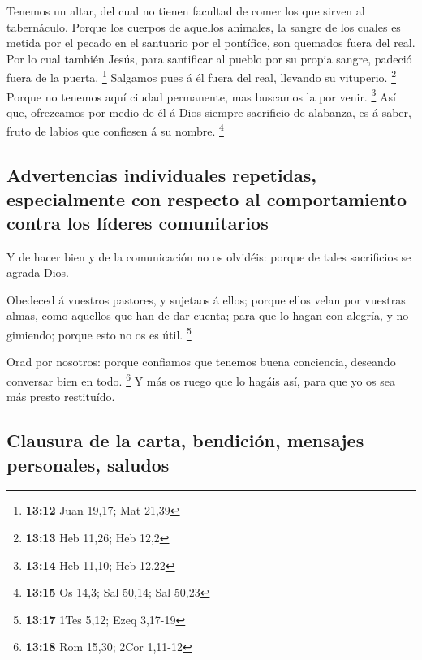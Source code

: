  Tenemos un altar, del cual no tienen facultad de comer
los que sirven al tabernáculo.  Porque los cuerpos de
aquellos animales, la sangre de los cuales es metida por el pecado en el
santuario por el pontífice, son quemados fuera del real. 
Por lo cual también Jesús, para santificar al pueblo por su propia
sangre, padeció fuera de la puerta. \footnote{\textbf{13:12} Juan 19,17;
  Mat 21,39}  Salgamos pues á él fuera del real, llevando
su vituperio. \footnote{\textbf{13:13} Heb 11,26; Heb 12,2}
 Porque no tenemos aquí ciudad permanente, mas buscamos
la por venir. \footnote{\textbf{13:14} Heb 11,10; Heb 12,22}
 Así que, ofrezcamos por medio de él á Dios siempre
sacrificio de alabanza, es á saber, fruto de labios que confiesen á su
nombre. \footnote{\textbf{13:15} Os 14,3; Sal 50,14; Sal 50,23}

\hypertarget{advertencias-individuales-repetidas-especialmente-con-respecto-al-comportamiento-contra-los-luxedderes-comunitarios}{%
\subsection{Advertencias individuales repetidas, especialmente con
respecto al comportamiento contra los líderes
comunitarios}\label{advertencias-individuales-repetidas-especialmente-con-respecto-al-comportamiento-contra-los-luxedderes-comunitarios}}

 Y de hacer bien y de la comunicación no os olvidéis:
porque de tales sacrificios se agrada Dios.

 Obedeced á vuestros pastores, y sujetaos á ellos; porque
ellos velan por vuestras almas, como aquellos que han de dar cuenta;
para que lo hagan con alegría, y no gimiendo; porque esto no os es útil.
\footnote{\textbf{13:17} 1Tes 5,12; Ezeq 3,17-19}

 Orad por nosotros: porque confiamos que tenemos buena
conciencia, deseando conversar bien en todo. \footnote{\textbf{13:18}
  Rom 15,30; 2Cor 1,11-12}  Y más os ruego que lo hagáis
así, para que yo os sea más presto restituído.

\hypertarget{clausura-de-la-carta-bendiciuxf3n-mensajes-personales-saludos}{%
\subsection{Clausura de la carta, bendición, mensajes personales,
saludos}\label{clausura-de-la-carta-bendiciuxf3n-mensajes-personales-saludos}}

